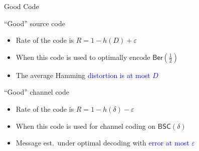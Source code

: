 \documentclass[10pt]{beamer}
\begin{document}
\begin{frame}{Good Code}
  \begin{block}{``Good'' source code}
    \begin{itemize}
    \item Rate of the code is $R=1-h(D)+\varepsilon$
    \item When this code is used to \alert{optimally encode} $\mathsf{Ber}(\tfrac{1}{2})$
    \item The average Hamming \textcolor{blue}{distortion is at most $D$}
    \end{itemize}
  \end{block}
  \vspace{0.4cm}
  \begin{block}{``Good'' channel code}
    \begin{itemize}
    \item Rate of the code is $R=1-h(\delta)-\varepsilon$
    \item When this code is used for channel coding on $\mathsf{BSC}(\delta)$
    \item Message est.~under \alert{optimal decoding} with \textcolor{blue}{error at most $\varepsilon$}
    \end{itemize}
  \end{block}
\end{frame}
\end{document}
